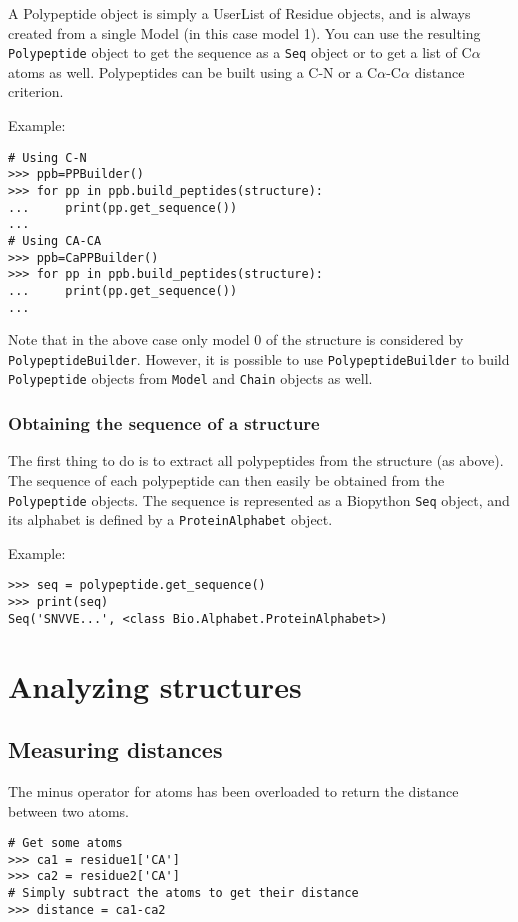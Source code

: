 \documentclass{report}
\begin{document}
A Polypeptide object is simply a UserList of Residue objects, and is always created from a single Model (in this case model 1).
You can use the resulting \texttt{Polypeptide} object to get the sequence as a \texttt{Seq} object or to get a list of C$\alpha$ atoms as well. Polypeptides can be built using a C-N or a C$\alpha$-C$\alpha$ distance criterion.

Example:

\begin{verbatim}
# Using C-N 
>>> ppb=PPBuilder()
>>> for pp in ppb.build_peptides(structure): 
...     print(pp.get_sequence())
...
# Using CA-CA
>>> ppb=CaPPBuilder()
>>> for pp in ppb.build_peptides(structure): 
...     print(pp.get_sequence())
...
\end{verbatim}
Note that in the above case only model 0 of the structure is considered
by \texttt{PolypeptideBuilder}. However, it is possible to use \texttt{PolypeptideBuilder}
to build \texttt{Polypeptide} objects from \texttt{Model} and \texttt{Chain}
objects as well.

\subsubsection*{Obtaining the sequence of a structure}

The first thing to do is to extract all polypeptides from the structure
(as above). The sequence of each polypeptide can then easily
be obtained from the \texttt{Polypeptide} objects. The sequence is
represented as a Biopython \texttt{Seq} object, and its alphabet is
defined by a \texttt{ProteinAlphabet} object.

Example:

\begin{verbatim}
>>> seq = polypeptide.get_sequence()
>>> print(seq)
Seq('SNVVE...', <class Bio.Alphabet.ProteinAlphabet>)
\end{verbatim}

\section{Analyzing structures}

\subsection{Measuring distances}
The minus operator for atoms has been overloaded to return the distance between two atoms. 
\begin{verbatim}
# Get some atoms
>>> ca1 = residue1['CA']
>>> ca2 = residue2['CA']
# Simply subtract the atoms to get their distance
>>> distance = ca1-ca2
\end{verbatim}
\end{document}
